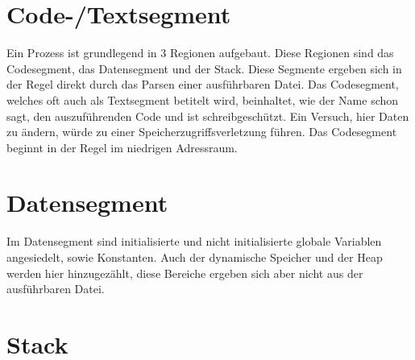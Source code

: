 \documentclass[12pt]{book}
\begin{document}
\section{Code-/Textsegment}

Ein Prozess ist grundlegend in 3 Regionen aufgebaut. Diese Regionen sind das
Codesegment, das Datensegment und der Stack. Diese Segmente ergeben sich in der
Regel direkt durch das Parsen einer ausführbaren Datei. Das Codesegment, welches
oft auch als Textsegment betitelt wird, beinhaltet, wie der Name schon sagt, den
auszuführenden Code und ist schreibgeschützt. Ein Versuch, hier Daten zu ändern,
würde zu einer Speicherzugriffsverletzung führen. Das Codesegment beginnt in der
Regel im niedrigen Adressraum.


\section{Datensegment}

Im Datensegment sind initialisierte und nicht initialisierte globale Variablen
angesiedelt, sowie Konstanten. Auch der dynamische Speicher und der Heap werden
hier hinzugezählt, diese Bereiche ergeben sich aber nicht aus der ausführbaren
Datei.

\section{Stack}
\end{document}
